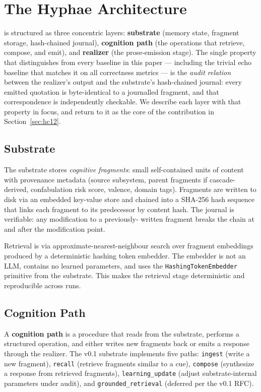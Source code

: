 \section{The Hyphae Architecture}
\label{sec:arch}

\hyphae{} is structured as three concentric layers:
\textbf{substrate} (memory state, fragment storage,
hash-chained journal), \textbf{cognition path} (the operations
that retrieve, compose, and emit), and \textbf{realizer}
(the prose-emission stage). The single property that
distinguishes \hyphae{} from every baseline in this paper ---
including the trivial echo baseline that matches it on all
correctness metrics --- is the \emph{audit relation} between the
realizer's output and the substrate's hash-chained journal: every
emitted quotation is byte-identical to a journalled fragment, and
that correspondence is independently checkable. We describe each
layer with that property in focus, and return to it as the core
of the contribution in Section~\ref{sec:hc12}.

\subsection{Substrate}

The substrate stores \emph{cognitive fragments}: small
self-contained units of content with provenance metadata
(source subsystem, parent fragments if cascade-derived,
confabulation risk score, valence, domain tags). Fragments
are written to disk via an embedded key-value store
\citep{redb, fjall} and chained into a SHA-256 hash sequence
that links each fragment to its predecessor by content hash.
The journal is verifiable: any modification to a previously-
written fragment breaks the chain at and after the modification
point.

Retrieval is via approximate-nearest-neighbour search
\citep{malkov2018hnsw} over fragment embeddings produced by a
deterministic hashing token embedder. The embedder is not an
LLM, contains no learned parameters, and uses the
\texttt{HashingTokenEmbedder} primitive from the substrate.
This makes the retrieval stage deterministic and reproducible
across runs.

\subsection{Cognition Path}

A \textbf{cognition path} is a procedure that reads from the
substrate, performs a structured operation, and either writes
new fragments back or emits a response through the realizer.
The v0.1 substrate implements five paths: \texttt{ingest}
(write a new fragment), \texttt{recall} (retrieve fragments
similar to a cue), \texttt{compose} (synthesize a response from
retrieved fragments), \texttt{learning\_update} (adjust
substrate-internal parameters under audit), and
\texttt{grounded\_retrieval} (deferred per the v0.1 RFC).

